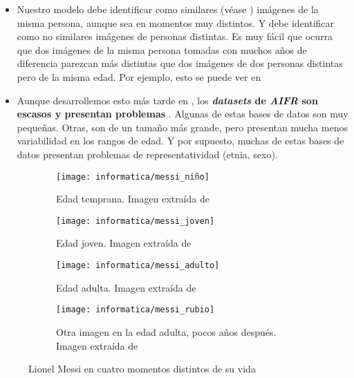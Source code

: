 \begin{itemize}
\item Nuestro modelo debe identificar como similares (véase ) imágenes de la misma persona, aunque sea en momentos muy distintos. Y debe identificar como no similares imágenes de personas distintas. Es muy fácil que ocurra que dos imágenes de la misma persona tomadas con muchos años de diferencia parezcan más distintas que dos imágenes de dos personas distintas pero de la misma edad. Por ejemplo, esto se puede ver en 

\item Aunque desarrollemos esto más tarde en , los \textbf{\textit{datasets} de \textit{AIFR} son escasos y presentan problemas} \cite{informatica:tecnica_sintesis_aifr}. Algunas de estas bases de datos son muy pequeñas. Otras, son de un tamaño más grande, pero presentan mucha menos variabilidad en los rangos de edad. Y por supuesto, muchas de estas bases de datos presentan problemas de representatividad (etnia, sexo).
\end{itemize}

\begin{figure}[H]
\centering
    \begin{subfigure}{0.5\textwidth}
        \centering
        \texttt{[image: informatica/messi\_niño]}
        \caption{Edad temprana. Imagen extraída de \cite{informatica:webimg_messi_pequeno}}
        \label{img:messi_pequeno}
    \end{subfigure}%
    \begin{subfigure}{.5\textwidth}
        \centering
        \texttt{[image: informatica/messi\_joven]}
        \caption{Edad joven. Imagen extraída de \cite{informatica:webimg_messi_joven}}
    \end{subfigure}%

    \begin{subfigure}{.5\textwidth}
        \centering
        \texttt{[image: informatica/messi\_adulto]}
        \caption{Edad adulta. Imagen extraída de \cite{informatica:webimg_messi_adulto}}
        \label{img:messi_adulto}
    \end{subfigure}%
    \begin{subfigure}{.5\textwidth}
        \centering
        \texttt{[image: informatica/messi\_rubio]}
        \caption{Otra imagen en la edad adulta, pocos años después. Imagen extraída de \cite{informatica:webimg_messi_rubio}}
    \end{subfigure}

    \caption{Lionel Messi en cuatro momentos distintos de su vida}
    \label{img:messi_cuatro_edades}

\end{figure}

